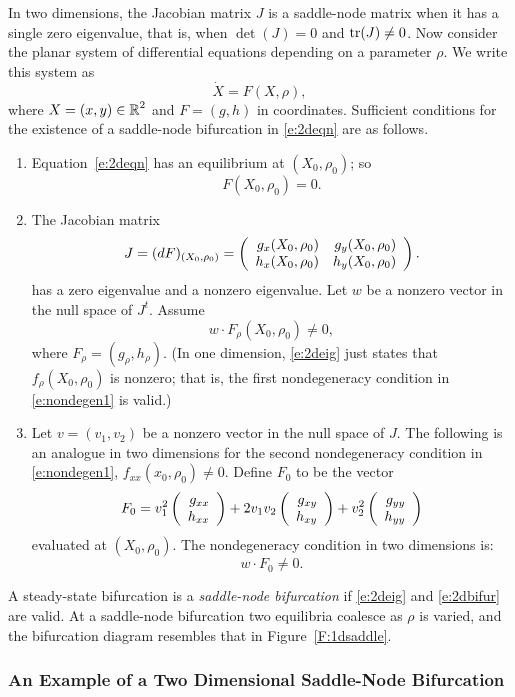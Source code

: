 \documentclass{ximera}
\begin{document}
In two dimensions, the Jacobian matrix $J$ is a saddle-node matrix when
it has a single zero eigenvalue, that is, when $\det(J)=0$ and 
${\rm tr}(J)\neq 0$.  Now consider the planar system of differential equations 
depending on a parameter $\rho$.  We write this system as
\begin{equation}  \label{e:2deqn}
\dot{X} = F(X,\rho),
\end{equation}
where $X=(x,y)\in\mbox{$\Bbb{R}$}^2$ and $F=(g,h)$ in coordinates.  Sufficient conditions
for the existence of a saddle-node bifurcation in \eqref{e:2deqn} are as follows.
\begin{enumerate}
\item Equation~\eqref{e:2deqn} has an equilibrium at $(X_0,\rho_0)$; so 
\[
F(X_0,\rho_0) = 0.
\]
\item  The Jacobian matrix 
\[
J=(dF)_{(X_0,\rho_0)}=
\left(\begin{array}{rr} g_x(X_0,\rho_0) & g_y(X_0,\rho_0)\\ h_x(X_0,\rho_0) &h_y(X_0,\rho_0)\end{array}\right).
\]
has a zero eigenvalue and a nonzero eigenvalue.  Let $w$ be a nonzero vector 
in the null space of $J^t$.  Assume
\begin{equation}  \label{e:2deig}
w \cdot F_\rho(X_0,\rho_0) \neq 0,
\end{equation}
where $F_\rho=(g_\rho,h_\rho)$.  (In one dimension, \eqref{e:2deig} just states 
that $f_\rho(X_0,\rho_0)$ is nonzero; that is, the first
nondegeneracy condition in 
\eqref{e:nondegen1} is valid.) 
\item   Let $v=(v_1,v_2)$ be a nonzero vector in the null space of $J$.
The following is an analogue in two dimensions for the second nondegeneracy
condition in \eqref{e:nondegen1}, $f_{xx}(x_0,\rho_0)\neq 0$. Define $F_0$ to 
be the vector
\[
F_0 = v_1^2\left(\begin{array}{r} g_{xx} \\ h_{xx}\end{array}\right) + 2v_1v_2\left(\begin{array}{r} g_{xy} \\ h_{xy}\end{array}\right)
+ v_2^2 \left(\begin{array}{r} g_{yy} \\ h_{yy}\end{array}\right)  
\]
evaluated at $(X_0,\rho_0)$.  The nondegeneracy condition in two dimensions
is:
\begin{equation}  \label{e:2dbifur}
w \cdot F_0 \neq 0.
\end{equation}
\end{enumerate}
A steady-state bifurcation is a {\em saddle-node bifurcation\/} if 
\eqref{e:2deig} and \eqref{e:2dbifur} are valid.  At a saddle-node bifurcation 
two equilibria coalesce as $\rho$ is varied, and the bifurcation diagram 
resembles that in Figure~\ref{F:1dsaddle}.

\subsubsection*{An Example of a Two Dimensional Saddle-Node Bifurcation}
\end{document}
